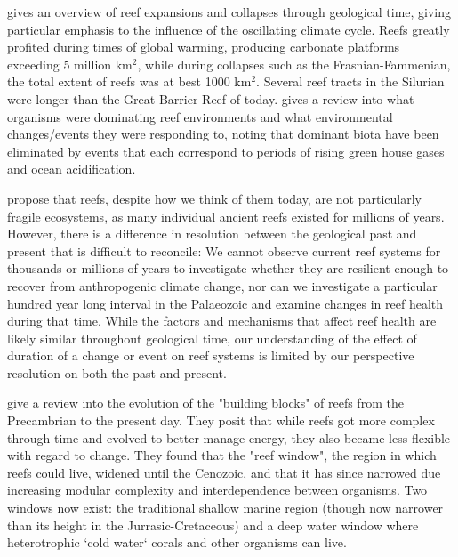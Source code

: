 \documentclass[11pt,a4paper]{article}
\begin{document}
\cite{Copper1994} gives an overview of reef expansions and collapses through geological time, giving particular emphasis to the influence of the oscillating climate cycle. Reefs greatly profited during times of global warming, producing carbonate platforms exceeding 5 million km$^{2}$, while during collapses such as the Frasnian-Fammenian, the total extent of reefs was at best 1000 km$^{2}$. Several reef tracts in the Silurian were longer than the Great Barrier Reef of today. \cite{Lipps2016} gives a review into what organisms were dominating reef environments and what environmental changes/events they were responding to, noting that dominant biota have been eliminated by events that each correspond to periods of rising green house gases and ocean acidification.

\cite{Lipps2016} propose that reefs, despite how we think of them today, are not particularly fragile ecosystems, as many individual ancient reefs existed for millions of years. However, there is a difference in resolution between the geological past and present that is difficult to reconcile: We cannot observe current reef systems for thousands or millions of years to investigate whether they are resilient enough to recover from anthropogenic climate change, nor can we investigate a particular hundred year long interval in the Palaeozoic and examine changes in reef health during that time. While the factors and mechanisms that affect reef health are likely similar throughout geological time, our understanding of the effect of duration of a change or event on reef systems is limited by our perspective resolution on both the past and present.

\cite{Leinfelder1999} give a review into the evolution of the "building blocks" of reefs from the Precambrian to the present day. They posit that while reefs got more complex through time and evolved to better manage energy, they also became less flexible with regard to change. They found that the "reef window", the region in which reefs could live, widened until the Cenozoic, and that it has since narrowed due increasing modular complexity and interdependence between organisms. Two windows now exist: the traditional shallow marine region (though now narrower than its height in the Jurrasic-Cretaceous) and a deep water window where heterotrophic `cold water` corals and other organisms can live. %
\end{document}
